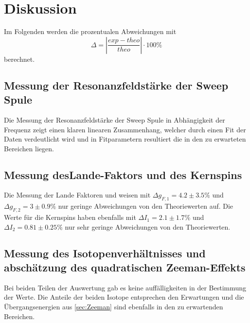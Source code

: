 \newpage
\section{Diskussion}
\label{sec:Diskussion}
Im Folgenden werden die prozentualen Abweichungen mit 
\begin{equation}\label{eq:1}
    \Delta = |\frac{exp - theo}{theo}|\cdot 100\%
\end{equation}
berechnet.
\subsection{Messung der Resonanzfeldstärke der Sweep Spule}
Die Messung der Resonanzfeldstärke der Sweep Spule in Abhängigkeit der Frequenz zeigt einen klaren linearen Zusammenhang, welcher durch einen Fit der Daten verdeutlicht wird und in Fitparametern resultiert die in den zu erwarteten Bereichen liegen. 
\subsection{Messung desLande-Faktors und des Kernspins}
Die Messung der Lande Faktoren und weisen mit $\Delta g_{F,1} = 4.2 \pm 3.5 \%$ und $\Delta g_{F,2} = 3 \pm 0.9 \%$ nur geringe Abweichungen von den Theoriewerten auf. Die Werte für die Kernspins haben ebenfalls mit 
$\Delta I_{1} = 2.1 \pm 1.7 \%$ und $\Delta I_{2} = 0.81 \pm 0.25 \%$ nur sehr geringe Abweichungen von den Theoriewerten.
\subsection{Messung des Isotopenverhältnisses und abschätzung des quadratischen Zeeman-Effekts}
Bei beiden Teilen der Auswertung gab es keine auffälligkeiten in der Bestimmung der Werte. Die Anteile der beiden Isotope entsprechen den Erwartungen und die Übergangsenergien aus \autoref{sec:Zeeman} sind ebenfalls in den zu erwartenden Bereichen.
\newpage